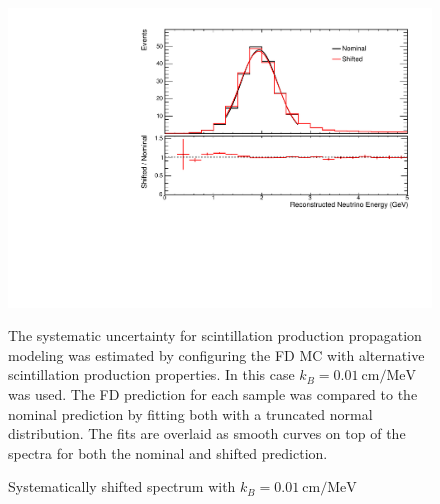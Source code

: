 {\begin{figure}
\end{figure}

\begin{figure}
\begin{center}
\includegraphics[width=\textwidth]{figures/systs/params/fd_birksc.pdf}
\end{center}
\caption{Systematically shifted spectrum with $k_B = 0.01~\text{cm} / \text{MeV}$}{
The systematic uncertainty for scintillation production propagation modeling
was estimated by configuring the FD MC with alternative
scintillation production properties.
In this case $k_B = 0.01~\text{cm} / \text{MeV}$ was used.
The FD prediction for each sample was compared to the nominal prediction
by fitting both with a truncated normal distribution.
The fits are overlaid as smooth curves on top of the spectra for both
the nominal and shifted prediction.
}
\label{syst_param_fd_birksc}

\end{figure}


}
